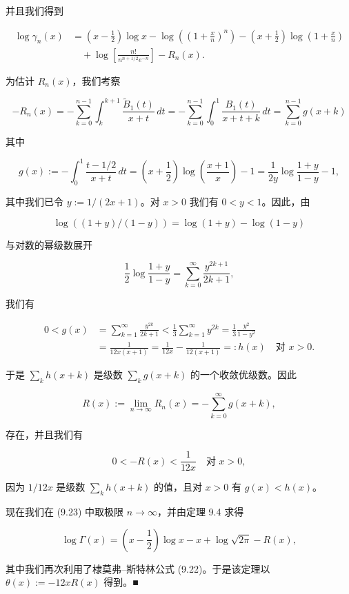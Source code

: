 \begin{theorem}
并且我们得到

\begin{equation}
\begin{aligned}
\log \gamma_n(x) &= \left( x - \frac{1}{2} \right) \log x - \log\left( \left( 1 + \frac{x}{n} \right)^{n} \right) - \left( x + \frac{1}{2} \right) \log\left( 1 + \frac{x}{n} \right) \\ &\quad + \log\left[ \frac{n!}{n^{n+1/2} e^{-n}} \right] - R_n(x) .
\end{aligned}\tag{9.23}
\end{equation}

为估计 $ R_n(x) $，我们考察

\[
-R_n(x) = -\sum_{k=0}^{n-1} \int_{k}^{k+1} \frac{\widetilde{B}_1(t)}{x+t} \, dt = -\sum_{k=0}^{n-1} \int_{0}^{1} \frac{B_1(t)}{x+t+k} \, dt = \sum_{k=0}^{n-1} g(x+k)
\]

其中

\[
g(x) := -\int_{0}^{1} \frac{t - 1/2}{x+t} \, dt = \left( x + \frac{1}{2} \right) \log\left( \frac{x+1}{x} \right) - 1 = \frac{1}{2y} \log\frac{1+y}{1-y} - 1 ,
\]

其中我们已令 $ y := 1/(2x+1) $。对 $ x > 0 $ 我们有 $ 0 < y < 1 $。因此，由

\[
\log\left( (1+y)/(1-y) \right) = \log(1+y) - \log(1-y)
\]

与对数的幂级数展开

\[
\frac{1}{2} \log\frac{1+y}{1-y} = \sum_{k=0}^{\infty} \frac{y^{2k+1}}{2k+1} ,
\]

我们有

\begin{equation*}
\begin{aligned}
0 < g(x) &= \sum_{k=1}^{\infty} \frac{y^{2k}}{2k+1} < \frac{1}{3} \sum_{k=1}^{\infty} y^{2k} = \frac{1}{3} \frac{y^{2}}{1 - y^{2}} \\ &= \frac{1}{12x(x+1)} = \frac{1}{12x} - \frac{1}{12(x+1)} =: h(x) \quad \text{对 } x > 0 .
\end{aligned}
\end{equation*}

于是 $ \sum_{k} h(x+k) $ 是级数 $ \sum_{k} g(x+k) $ 的一个收敛优级数。因此

\[
R(x) := \lim_{n \to \infty} R_n(x) = -\sum_{k=0}^{\infty} g(x+k) ,
\]

存在，并且我们有

\[
0 < -R(x) < \frac{1}{12x} \quad \text{对 } x > 0 ,
\]

因为 $ 1/12x $ 是级数 $ \sum_{k} h(x+k) $ 的值，且对 $ x > 0 $ 有 $ g(x) < h(x) $。

现在我们在 (9.23) 中取极限 $ n \to \infty $，并由定理 9.4 求得

\[
\log \Gamma(x) = \left( x - \frac{1}{2} \right) \log x - x + \log\sqrt{2\pi} - R(x) ,
\]

其中我们再次利用了棣莫弗–斯特林公式 (9.22)。于是该定理以 $ \theta(x) := -12xR(x) $ 得到。\nobreak\hspace{0.35em}■

\end{theorem}

